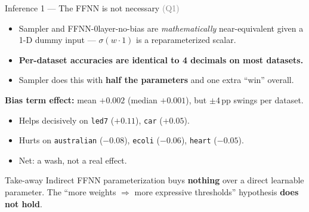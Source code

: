 \documentclass[aspectratio=169,10pt]{beamer}
\newcommand{\dataset}[1]{\texttt{#1}}
\begin{document}
\begin{frame}{Inference 1 --- The FFNN is not necessary \hfill \small\textcolor{gray}{(Q1)}}
  \begin{itemize}
    \item Sampler and FFNN-0layer-no-bias are \emph{mathematically} near-equivalent given a 1-D dummy input --- $\sigma(w \cdot 1)$ is a reparameterized scalar.
    \item \textbf{Per-dataset accuracies are identical to 4 decimals on most datasets.}
    \item Sampler does this with \textbf{half the parameters} and one extra ``win'' overall.
  \end{itemize}

  \medskip
  \textbf{Bias term effect:} mean $+0.002$ (median $+0.001$), but $\pm 4$\,pp swings per dataset.
  \begin{itemize}
    \item Helps decisively on \dataset{led7} ($+0.11$), \dataset{car} ($+0.05$).
    \item Hurts on \dataset{australian} ($-0.08$), \dataset{ecoli} ($-0.06$), \dataset{heart} ($-0.05$).
    \item Net: a wash, not a real effect.
  \end{itemize}

  \medskip
  \begin{block}{Take-away}
    Indirect FFNN parameterization buys \textbf{nothing} over a direct learnable parameter.
    The ``more weights $\Rightarrow$ more expressive thresholds'' hypothesis \textbf{does not hold}.
  \end{block}
\end{frame}
\end{document}
